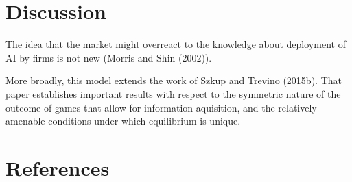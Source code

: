\documentclass[
]{article}
\theoremstyle{plain}
\theoremstyle{remark}
\begin{document}
\hypertarget{discussion}{%
\section{Discussion}\label{discussion}}

The idea that the market might overreact to the knowledge about
deployment of AI by firms is not new (Morris and Shin (2002)).

More broadly, this model extends the work of Szkup and Trevino (2015b).
That paper establishes important results with respect to the symmetric
nature of the outcome of games that allow for information aquisition,
and the relatively amenable conditions under which equilibrium is
unique.

\hypertarget{references}{%
\section*{References}\label{references}}
\end{document}

